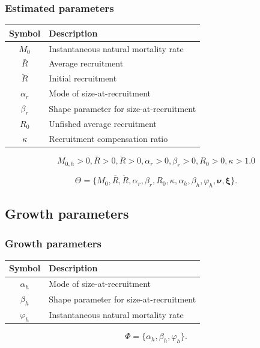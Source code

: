 \documentclass{beamer}
\begin{document}
\begin{frame}
\frametitle{Estimated parameters}

\begin{table}
  \centering
  \begin{tabular}{cl}
  \hline
  Symbol  & Description \\
  \hline
      $M_0$       & Instantaneous natural mortality rate\\
      $\bar{R}$   & Average recruitment\\
      $\ddot{R}$  & Initial recruitment\\
      $\alpha_r$  & Mode of size-at-recruitment\\
      $\beta_r $  & Shape parameter for size-at-recruitment\\
      $R_0$       & Unfished average recruitment\\
      $\kappa$    & Recruitment compensation ratio\\
  \hline
  \end{tabular}
\end{table}

\begin{equation*}
  M_{0,h} > 0, \bar{R} > 0, \ddot{R} > 0, \alpha_r > 0, \beta_r > 0, R_0 > 0, \kappa
  > 1.0
\end{equation*}

\begin{equation*}
  \Theta = \{ M_0, \bar{R}, \ddot{R}, \alpha_r, \beta_r, R_0, \kappa,
  \alpha_h, \beta_h, \varphi_h, \boldsymbol\nu, \boldsymbol\xi \}.
\end{equation*}

\end{frame}


\subsection{Growth parameters}
\begin{frame}
\frametitle{Growth parameters}

\begin{table}
  \centering
  \begin{tabular}{cl}
  \hline
  Symbol  & Description \\
  \hline
      $\alpha_h$  & Mode of size-at-recruitment\\
      $\beta_h$   & Shape parameter for size-at-recruitment\\
      $\varphi_h$ & Instantaneous natural mortality rate\\
  \hline
  \end{tabular}
\end{table}

\begin{equation*}
  \Phi = \{ \alpha_h, \beta_h, \varphi_h \}.
\end{equation*}

\end{frame}
\end{document}
